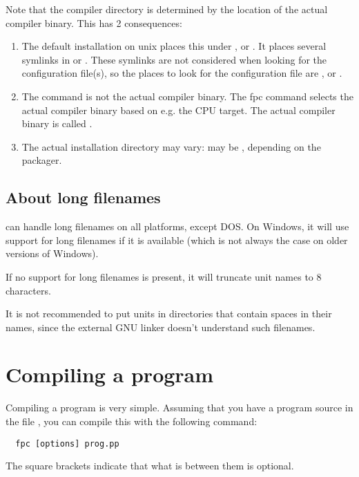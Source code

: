 \begin{remark}
Note that the compiler directory is determined by the location of the actual compiler binary.
This has 2 consequences:
\begin{enumerate}
\item The default installation on unix places this under , or . It places several
symlinks in  or . These symlinks are not
considered when looking for the configuration file(s), so the places to look
for the configuration file are , or .
\item The  command is not the actual compiler binary. The fpc
command selects the actual compiler binary based on e.g. the CPU target. The
actual compiler binary is called .
\item The actual installation directory may vary: 
may be , depending on the packager.
\end{enumerate}
\end{remark}


\subsection{About long filenames}
\fpc can handle long filenames on all platforms, except DOS.
On Windows, it will use support for long filenames if it is available
(which is not always the case on older versions of Windows).

If no support for long filenames is present, it will truncate unit names
to 8 characters.

It is not recommended to put units in directories that contain spaces in
their names, since the external GNU linker doesn't understand such filenames.

\section{Compiling a program}
Compiling a program is very simple. Assuming that you have a program source
in the file , you can compile this with the following command:
\begin{verbatim}
  fpc [options] prog.pp
\end{verbatim}
The square brackets \var{[\ ]} indicate that what is between them is optional.

